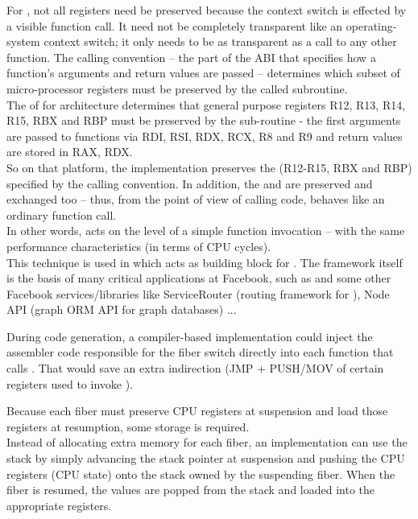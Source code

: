 \label{callingconvention}
For \fiber, not all registers need be preserved because the context
switch is effected by a visible function call. It need not be completely transparent like
an operating-system context switch; it only needs to be as transparent as a call
to any other function. The calling convention -- the part of the ABI that
specifies how a function's arguments and return values are passed -- determines
which subset of micro-processor registers must be preserved by the called
subroutine.\\

The \cite{SYSVABI} of  for 
architecture determines that general purpose registers R12, R13, R14, R15, RBX
and RBP must be preserved by the sub-routine - the first arguments are passed
to functions via RDI, RSI, RDX, RCX, R8 and R9 and return values are stored in
RAX, RDX.\\
So on that platform, the \resume implementation preserves the  (R12-R15, RBX and RBP) specified by the calling convention.
In addition, the  and  are
preserved and exchanged too -- thus, from the point of view of calling
code, \resume behaves like an ordinary function call.\\
In other words, \resume acts on the level of a simple function invocation --
with the same performance characteristics (in terms of CPU cycles).\\

This technique is used in \bcontext\cite{bcontext} which acts as building block
for \fbfibers. The \fbfibers\xspace framework itself is the basis of many
critical applications at Facebook, such as \fbmcrouter\cite{fbmcrouter}
and some other Facebook services/libraries like ServiceRouter (routing framework
for \fbthrift\cite{fbthrift}), Node API (graph ORM API for graph databases) ...

 During code generation,
a compiler-based implementation could inject the assembler code responsible
for the fiber switch directly into each function that calls \resume. That would save
an extra indirection (JMP + PUSH/MOV of certain registers used to
invoke \resume).

 Because each fiber must preserve CPU
registers at suspension and load those registers at resumption, some storage
is required.\\
Instead of allocating extra memory for each fiber, an implementation can use
the stack by simply advancing the stack pointer at suspension and pushing the
CPU registers (CPU state) onto the stack owned by the suspending fiber. When
the fiber is resumed, the values are popped from the stack and loaded into the
appropriate registers.\\

